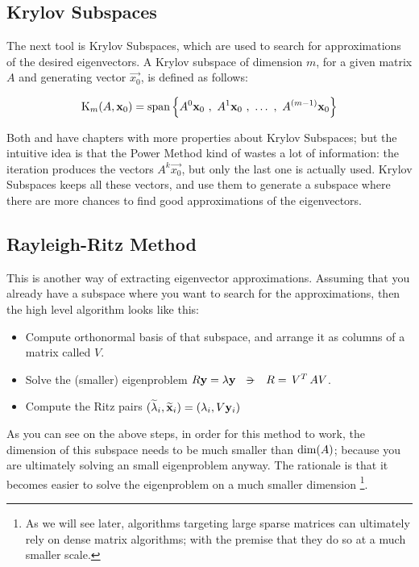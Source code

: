 \subsection{Krylov Subspaces}

The next tool is Krylov Subspaces, which are used to search for
approximations of the desired eigenvectors. A Krylov subspace of
dimension $m$, for a given matrix $A$ and generating vector
$\vec{x_0}$, is defined as follows: 

\begin{equation*}
    \Krylov{A}{\vec{x}_0}{m} =
    \func{span}
    \left\{
      A^0\vec{x}_0\ds{,} A^1\vec{x}_0\ds{,} \ldots \ds{,}  A^{(m-1)}\vec{x}_0
      \right\}  
\end{equation*}
\joinbelow{1cm}

Both \cite{parlett80} and \cite{saad92} have chapters with more
properties about Krylov Subspaces; but the intuitive idea is that the
Power Method kind of wastes a lot of information: the iteration
produces the vectors $A^k\vec{x_0}$, but only the last one is actually
used. Krylov Subspaces keeps all these vectors, and use them to
generate a subspace where there are more chances to find good
approximations of the eigenvectors.

\subsection{Rayleigh-Ritz Method}

This is another way of extracting eigenvector approximations. Assuming
that you 
already have a subspace where you want to search for the
approximations, then the high level algorithm looks like this:

\begin{itemize}
  \item Compute orthonormal basis of that subspace, and arrange it as
    columns of a matrix called $V$.
  \item Solve the (smaller) eigenproblem $R\vec{y} = \lambda\vec{y}
    \ds{\suchthat} R = \trans{V} A V$. 
  \item Compute the Ritz pairs
      $(\apx{\lambda}_i,\apx{\vec{x}}_i) = (\lambda_i, V\vec{y}_i)$
\end{itemize}

As you can see on the above steps, in order for this method to work,
the dimension of this subspace  needs to be much smaller than
$\func{dim}(A)$; because you are ultimately solving an small
eigenproblem anyway.  The rationale is that it becomes easier to
solve the eigenproblem on a much smaller dimension \footnote{As we
  will see later, algorithms targeting large sparse matrices can
  ultimately rely on dense matrix algorithms; with the premise that
  they do so at a much smaller scale.}. \\

